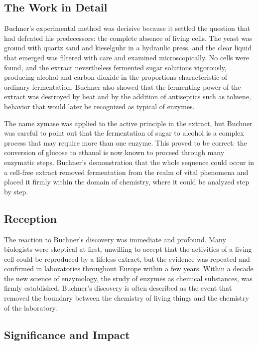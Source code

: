 \subsection*{The Work in Detail}

Buchner's experimental method was decisive because it settled the question that had defeated his predecessors: the complete absence of living cells. The yeast was ground with quartz sand and kieselguhr in a hydraulic press, and the clear liquid that emerged was filtered with care and examined microscopically. No cells were found, and the extract nevertheless fermented sugar solutions vigorously, producing alcohol and carbon dioxide in the proportions characteristic of ordinary fermentation. Buchner also showed that the fermenting power of the extract was destroyed by heat and by the addition of antiseptics such as toluene, behavior that would later be recognized as typical of enzymes.

The name zymase was applied to the active principle in the extract, but Buchner was careful to point out that the fermentation of sugar to alcohol is a complex process that may require more than one enzyme. This proved to be correct: the conversion of glucose to ethanol is now known to proceed through many enzymatic steps. Buchner's demonstration that the whole sequence could occur in a cell-free extract removed fermentation from the realm of vital phenomena and placed it firmly within the domain of chemistry, where it could be analyzed step by step.

\subsection*{Reception}

The reaction to Buchner's discovery was immediate and profound. Many biologists were skeptical at first, unwilling to accept that the activities of a living cell could be reproduced by a lifeless extract, but the evidence was repeated and confirmed in laboratories throughout Europe within a few years. Within a decade the new science of enzymology, the study of enzymes as chemical substances, was firmly established. Buchner's discovery is often described as the event that removed the boundary between the chemistry of living things and the chemistry of the laboratory.

\subsection*{Significance and Impact}

